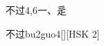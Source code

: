 \begin{entry}{不过}{4,6}{⼀、⾡}
  \begin{phonetics}{不过}{bu2guo4}[][HSK 2]
  \end{phonetics}
\end{entry}
